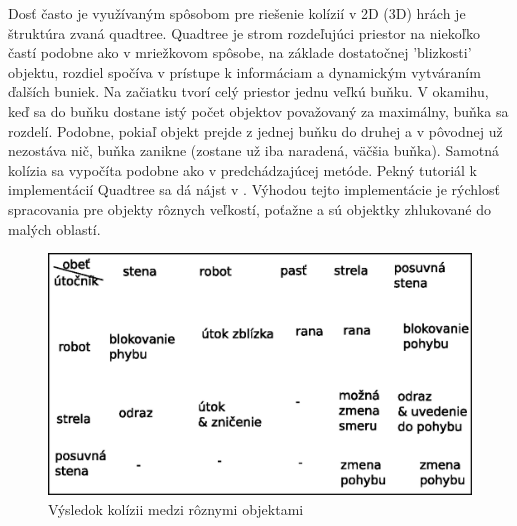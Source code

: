 \indent Dosť často je využívaným spôsobom pre riešenie kolízií v 2D (3D) hrách je štruktúra zvaná quadtree. Quadtree je strom rozdeľujúci priestor na niekoľko častí podobne ako v mriežkovom spôsobe, na základe dostatočnej 'blizkosti' objektu, rozdiel spočíva v prístupe k informáciam a dynamickým vytváraním ďalších buniek. Na začiatku tvorí celý priestor jednu veľkú buňku. V okamihu, keď sa do buňku dostane istý počet objektov považovaný za maximálny, buňka sa rozdelí. Podobne, pokiaľ objekt prejde z jednej buňku do druhej a v pôvodnej už nezostáva nič, buňka zanikne (zostane už iba naradená, väčšia buňka). Samotná kolízia sa vypočíta podobne ako v predchádzajúcej metóde. Pekný tutoriál k implementácií Quadtree sa dá  nájst v \cite{quadtree}. Výhodou tejto implementácie je rýchlosť spracovania pre objekty rôznych veľkostí, poťažne a sú objektky zhlukované do malých oblastí.
\begin {figure}
\centering
\includegraphics{kolizie}
{ Výsledok kolízii medzi rôznymi objektami }
\label{fig:kol}
\end {figure}

